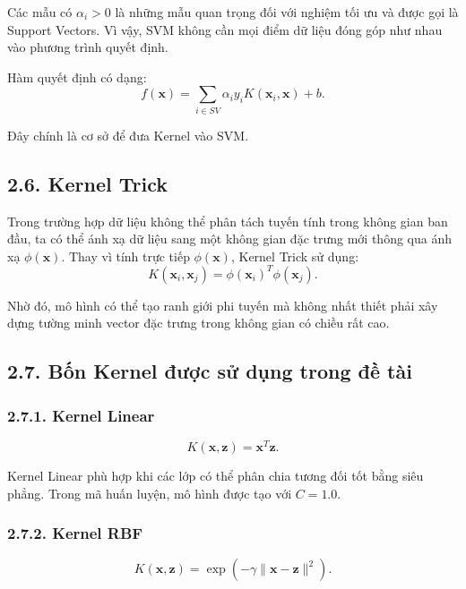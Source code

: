 \documentclass{article}
\begin{document}
	Các mẫu có $\alpha_i>0$ là những mẫu quan trọng đối với nghiệm tối ưu và được gọi là Support Vectors. Vì vậy, SVM không cần mọi điểm dữ liệu đóng góp như nhau vào phương trình quyết định.
	
	Hàm quyết định có dạng:
	\begin{equation}
		f(\mathbf{x})=
		\sum_{i\in SV}\alpha_i y_i K(\mathbf{x}_i,\mathbf{x})+b.
	\end{equation}
	
	Đây chính là cơ sở để đưa Kernel vào SVM.
	
	\subsection{2.6. Kernel Trick}
	\hspace{0.5cm}
	Trong trường hợp dữ liệu không thể phân tách tuyến tính trong không gian ban đầu, ta có thể ánh xạ dữ liệu sang một không gian đặc trưng mới thông qua ánh xạ $\phi(\mathbf{x})$. Thay vì tính trực tiếp $\phi(\mathbf{x})$, Kernel Trick sử dụng:
	\begin{equation}
		K(\mathbf{x}_i,\mathbf{x}_j)=
		\phi(\mathbf{x}_i)^T\phi(\mathbf{x}_j).
	\end{equation}
	
	Nhờ đó, mô hình có thể tạo ranh giới phi tuyến mà không nhất thiết phải xây dựng tường minh vector đặc trưng trong không gian có chiều rất cao.
	
	\subsection{2.7. Bốn Kernel được sử dụng trong đề tài}
	
	\subsubsection{2.7.1. Kernel Linear}
	\begin{equation}
		K(\mathbf{x},\mathbf{z})=\mathbf{x}^{T}\mathbf{z}.
	\end{equation}
	
	Kernel Linear phù hợp khi các lớp có thể phân chia tương đối tốt bằng siêu phẳng. Trong mã huấn luyện, mô hình được tạo với $C=1.0$.
	
	\subsubsection{2.7.2. Kernel RBF}
	\begin{equation}
		K(\mathbf{x},\mathbf{z})=
		\exp\left(-\gamma\|\mathbf{x}-\mathbf{z}\|^2\right).
	\end{equation}
	
\end{document}
